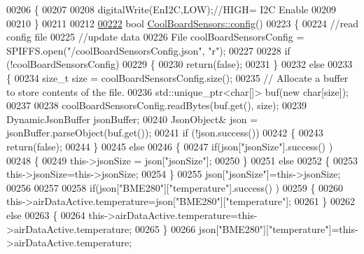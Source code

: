 \begin{DoxyCode}
00206 \{
00207 
00208     digitalWrite(EnI2C,LOW);\textcolor{comment}{//HIGH= I2C Enable}
00209 
00210 \}
00211 
00212 
\hyperlink{class_cool_board_sensors_a9a218895c5423375c33c08f2c56fb23a}{00222} \textcolor{keywordtype}{bool} \hyperlink{class_cool_board_sensors_a9a218895c5423375c33c08f2c56fb23a}{CoolBoardSensors::config}()
00223 \{
00224     \textcolor{comment}{//read config file}
00225     \textcolor{comment}{//update data}
00226     File coolBoardSensorsConfig = SPIFFS.open(\textcolor{stringliteral}{"/coolBoardSensorsConfig.json"}, \textcolor{stringliteral}{"r"});
00227 
00228     \textcolor{keywordflow}{if} (!coolBoardSensorsConfig) 
00229     \{
00230         \textcolor{keywordflow}{return}(\textcolor{keyword}{false});
00231     \}
00232     \textcolor{keywordflow}{else}
00233     \{
00234         \textcolor{keywordtype}{size\_t} size = coolBoardSensorsConfig.size();
00235         \textcolor{comment}{// Allocate a buffer to store contents of the file.}
00236         std::unique\_ptr<char[]> buf(\textcolor{keyword}{new} \textcolor{keywordtype}{char}[size]);
00237 
00238         coolBoardSensorsConfig.readBytes(buf.get(), size);
00239         DynamicJsonBuffer jsonBuffer;
00240         JsonObject& json = jsonBuffer.parseObject(buf.get());
00241         \textcolor{keywordflow}{if} (!json.success()) 
00242         \{
00243               \textcolor{keywordflow}{return}(\textcolor{keyword}{false});
00244         \} 
00245         \textcolor{keywordflow}{else}
00246         \{     
00247             \textcolor{keywordflow}{if}(json[\textcolor{stringliteral}{"jsonSize"}].success() )
00248             \{
00249                 this->jsonSize = json[\textcolor{stringliteral}{"jsonSize"}]; 
00250             \}
00251             \textcolor{keywordflow}{else}
00252             \{
00253                 this->jsonSize=this->jsonSize;          
00254             \}
00255             json[\textcolor{stringliteral}{"jsonSize"}]=this->jsonSize;
00256 
00257             
00258             \textcolor{keywordflow}{if}(json[\textcolor{stringliteral}{"BME280"}][\textcolor{stringliteral}{"temperature"}].success() )
00259             \{           
00260                 this->airDataActive.temperature=json[\textcolor{stringliteral}{"BME280"}][\textcolor{stringliteral}{"temperature"}];
00261             \}
00262             \textcolor{keywordflow}{else}
00263             \{
00264                 this->airDataActive.temperature=this->airDataActive.temperature;            
00265             \}
00266             json[\textcolor{stringliteral}{"BME280"}][\textcolor{stringliteral}{"temperature"}]=this->airDataActive.temperature;

\end{DoxyCode}
